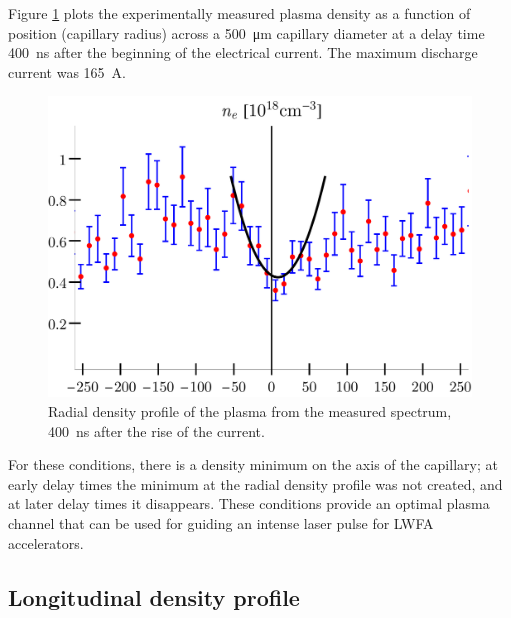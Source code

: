 \documentclass[../main.tex]{subfiles}
\begin{document}
Figure \ref{fig:plasma_channel_spectro} plots the experimentally measured plasma density as a function of position (capillary radius) across a \SI{500}{\um} capillary diameter at a delay time \SI{400}{\ns} after the beginning of the electrical current. The maximum discharge current was \SI{165}{\A}.

\begin{figure}
\centering
\includegraphics[width=\textwidth]{figures/spectro/parabolic.pdf}
\caption{Radial density profile of the plasma from the measured spectrum, \SI{400}{\ns} after the rise of the current.}
\label{fig:plasma_channel_spectro}
\end{figure}

For these conditions, there is a density minimum on the axis of the capillary; at early delay times the minimum at the radial density profile was not created, and at later delay times it disappears. These conditions provide an optimal plasma channel that can be used for guiding an intense laser pulse for LWFA accelerators.

\subsection{Longitudinal density profile}\label{ssec:longi}
\end{document}
